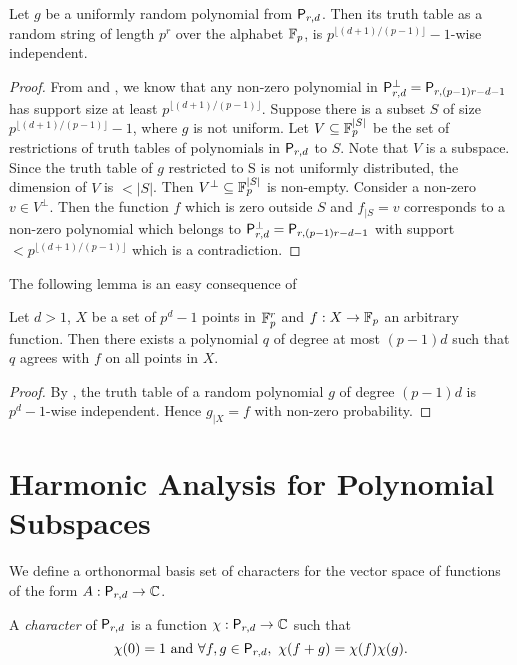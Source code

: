  \begin{lemma} \label{lem:low-deg-local-ind} Let $g$ be a
uniformly random polynomial from $\mathsf P_{r,d}$. Then its truth table as a random string of length $p^r$
over the alphabet $\mathbb F_p$, is $p^{\lfloor (d+1)/(p-1) \rfloor} - 1$-wise independent.
\end{lemma} 
\begin{proof} From   and
, we know that any non-zero polynomial in $\mathsf P^{\perp}_{r,d} = \mathsf P_{r,(p-1)r - d -1}$
has support size at least $p^{\lfloor (d+1)/(p-1) \rfloor}$. Suppose there is a subset $S$
of size $p^{\lfloor (d+1)/(p-1) \rfloor}-1$, where $g$ is not uniform. Let $V \subseteq \mathbb F_p^{|S|}$
 be the set of restrictions of
truth tables of polynomials in $\mathsf P_{r,d}$ to $S$. Note that $V$ is a subspace. Since
the truth table of $g$ restricted to S is not uniformly distributed, the dimension 
of $V$ is $<|S|$. Then $V^{\perp} \subseteq \mathbb F_p^{|S|}$ is non-empty. Consider a
non-zero $v \in V^{\perp}$. Then the function $f$ which is zero outside $S$ and $f_{|S} = v$
corresponds to a non-zero polynomial which belongs to $\mathsf P^{\perp}_{r,d} = \mathsf P_{r,(p-1)r - d -1}$
with support $< p^{\lfloor (d+1)/(p-1) \rfloor}$ which is a contradiction.

\end{proof}


The following lemma is an easy consequence of  
\begin{lemma}
\label{lem:interpol}
 Let $d>1$, $X$ be a set of $p^{d}-1$ points in $\mathbb F^r_p$ and
$f:X \rightarrow \mathbb F_p$ an arbitrary function. Then there exists a polynomial $q$
of degree at most $(p-1)d$ such that $q$ agrees with $f$ on all points in $X$.
\end{lemma} 
\begin{proof} 
By , 
the truth table of a random polynomial $g$ of degree $(p-1)d$ is $p^d -1$-wise independent.
Hence $g_{|X} = f$ with non-zero probability.
 \end{proof} 

\section{Harmonic Analysis for Polynomial Subspaces} 
\label{sec:har-poly}

We  define a
orthonormal basis set of characters for the vector space of functions of the
form $A:\mathsf P_{r,d} \rightarrow \mathbb C$. 
\begin{definition}[Character] 
A \emph{character} of $\mathsf P_{r,d}$ is a function $\chi:\mathsf P_{r,d} \rightarrow \mathbb C$
such that 
$$\chi(0) = 1 \text{ and } \forall f,g \in \mathsf P_{r,d},~ \chi(f+g)=\chi(f)\chi(g).$$ 
\end{definition}

